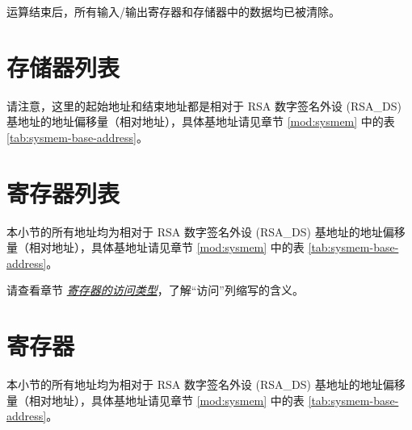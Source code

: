 \documentclass[main\_\_CN.tex]{subfiles}
\begin{document}
运算结束后，所有输入/输出寄存器和存储器中的数据均已被清除。



\newpage
\section{ 存储器列表 }
\label{sec:digsig-mem-summ}

请注意，这里的起始地址和结束地址都是相对于 RSA 数字签名外设 (RSA\_DS) 基地址的地址偏移量（相对地址），具体基地址请见章节 \ref{mod:sysmem} \textit{} 中的表 \ref{tab:sysmem-base-address}。






\newpage
\hypertarget{digsig-reg-summ}{}
\section{寄存器列表}
\label{sec:digsig-reg-summ}

本小节的所有地址均为相对于 RSA 数字签名外设 (RSA\_DS) 基地址的地址偏移量（相对地址），具体基地址请见章节 \ref{mod:sysmem} \textit{} 中的表 \ref{tab:sysmem-base-address}。

请查看章节 \hyperref[glossary-access-types]{\textit{寄存器的访问类型}}，了解“访问”列缩写的含义。






\newpage
\section{寄存器}

本小节的所有地址均为相对于 RSA 数字签名外设 (RSA\_DS) 基地址的地址偏移量（相对地址），具体基地址请见章节 \ref{mod:sysmem} \textit{} 中的表 \ref{tab:sysmem-base-address}。


\end{document}
